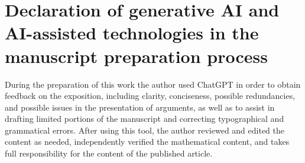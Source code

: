 \documentclass[11pt,reqno]{amsart}
\theoremstyle{definition}
\begin{document}
\section*{Declaration of generative AI and AI-assisted technologies in the manuscript preparation process}

During the preparation of this work the author used ChatGPT in order to obtain feedback on the exposition, including clarity, conciseness, possible redundancies, and possible issues in the presentation of arguments, as well as to assist in drafting limited portions of the manuscript and correcting typographical and grammatical errors. After using this tool, the author reviewed and edited the content as needed, independently verified the mathematical content, and takes full responsibility for the content of the published article.



\end{document}
